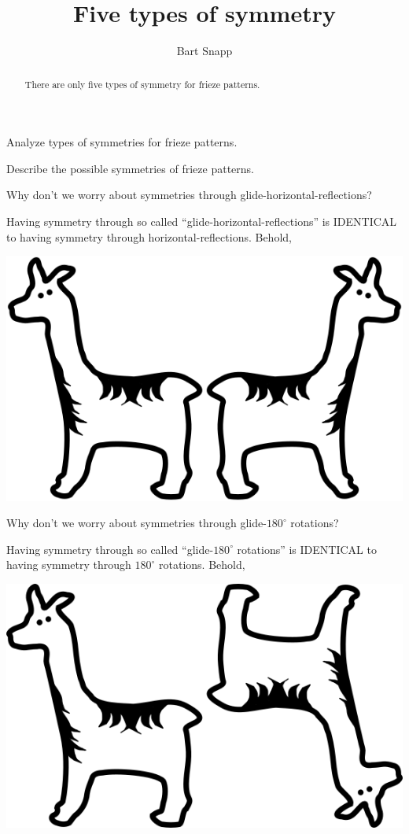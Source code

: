 \documentclass[noauthor,nooutcomes,12pt,hints,handout]{ximera}
\author{Bart Snapp}
\title{Five types of symmetry}
\begin{document}
\begin{abstract}
  There are only five types of symmetry for frieze patterns.
\end{abstract}
\maketitle

\begin{listOutcomes}
\item Analyze types of symmetries for frieze patterns.
\item Describe the possible symmetries of frieze patterns.
\end{listOutcomes}



\mynewpage


\begin{question}
  Why don't we worry about symmetries through
  glide-horizontal-reflections?
  \begin{freeResponse}
    Having symmetry through so called ``glide-horizontal-reflections''
    is IDENTICAL to having symmetry through
    horizontal-reflections. Behold,
    \begin{center}
      \includegraphics[width=.3\textwidth]{llamaGHF.png}
    \end{center}
  \end{freeResponse}
\end{question}
\mynewpage

\begin{question}
  Why don't we worry about symmetries through glide-$180^\circ$
  rotations?
  \begin{freeResponse}
    Having symmetry through so called ``glide-$180^\circ$ rotations''
    is IDENTICAL to having symmetry through
    $180^\circ$ rotations. Behold,
    \begin{center}
      \includegraphics[width=.3\textwidth]{llamaGR.png}
    \end{center}
  \end{freeResponse}
\end{question}
\mynewpage
\end{document}
